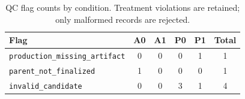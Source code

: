 \begin{table}[ht]
\centering
\caption{QC flag counts by condition.
  Treatment violations are retained; only malformed records are rejected.}
\label{tab:qc}
\begin{tabular}{lccccc}
\toprule
Flag & A0 & A1 & P0 & P1 & Total \\
\midrule
  \texttt{production\_missing\_artifact} & 0 & 0 & 0 & 1 & 1 \\
  \texttt{parent\_not\_finalized} & 1 & 0 & 0 & 0 & 1 \\
  \texttt{invalid\_candidate} & 0 & 0 & 3 & 1 & 4 \\
\bottomrule
\end{tabular}
\end{table}
